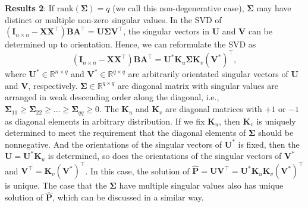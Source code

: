 \documentclass[titlepage,11pt,twoside]{article}
\begin{document}
\textbf{Results 2}: If $\text{rank}(\mathbf{\Sigma})=q$ (we call this non-degenerative case), $\mathbf{\Sigma}$ may have distinct or multiple non-zero singular values. In the SVD of $(\mathbf{I}_{n\times n}-\mathbf{X}\mathbf{X}^{\top})\mathbf{B}\mathbf{A}^{\top}
=
\mathbf{U}\mathbf{\Sigma}\mathbf{V}^{\top}$, the singular vectors in $\mathbf{U}$ and $\mathbf{V}$
can be determined up to orientation. Hence, we can reformulate the SVD as 
\begin{equation}
(\mathbf{I}_{n\times n}-\mathbf{X}\mathbf{X}^{\top})\mathbf{B}\mathbf{A}^{\top}
=
\mathbf{U}^{*}\mathbf{K}_{u}\mathbf{\Sigma}\mathbf{K}_{v}(\mathbf{V}^{*})^{\top},
\end{equation}
where $\mathbf{U}^{*}\in \mathbb{R}^{n\times q}$ and $\mathbf{V}^{*}\in \mathbb{R}^{q\times q}$ are arbitrarily orientated singular vectors of $\mathbf{U}$ and $\mathbf{V}$, respectively. $\mathbf{\Sigma}\in \mathbb{R}^{q\times q}$ are diagonal matrix with singular values are arranged in weak descending order along the diagonal, i.e., $\mathbf{\Sigma}_{11}\ge\mathbf{\Sigma}_{22}\ge...\ge\mathbf{\Sigma}_{qq}\ge0$. The $\mathbf{K}_{u}$ and $\mathbf{K}_{v}$ are diagonal matrices with $+1$ or $-1$ as diagonal elements in arbitrary distribution. If we fix $\mathbf{K}_{u}$, then $\mathbf{K}_{v}$ is uniquely determined to meet the requirement that the diagonal elements of $\mathbf{\Sigma}$ should be nonnegative. And the orientations of the singular vectors of $\mathbf{U}^{*}$ is fixed, then the $\mathbf{U}=\mathbf{U}^{*}\mathbf{K}_{u}$ is determined, so does the orientations of the singular vectors of $\mathbf{V}^{*}$ and $\mathbf{V}^{\top}=\mathbf{K}_{v}(\mathbf{V}^{*})^{\top}$. In this case, the solution of $\mathbf{\hat{P}}=\mathbf{U}\mathbf{V}^{\top}=\mathbf{U}^{*}\mathbf{K}_{u}\mathbf{K}_{v}(\mathbf{V}^{*})^{\top}$ is unique. The case that the $\mathbf{\Sigma}$ have multiple singular values also has unique solution of $\mathbf{\hat{P}}$, which can be discussed in a similar way. 
\end{document}
